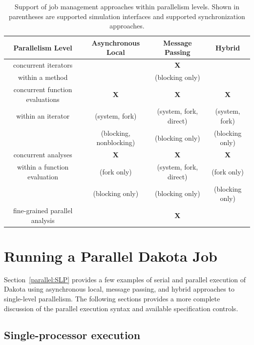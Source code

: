 \begin{table}
  \centering
  \caption{Support of job management approaches within parallelism levels.
  Shown in parentheses are supported simulation interfaces and supported
  synchronization approaches.}
  \label{parallel:table01}\vspace{2mm}
  \begin{tabular}{c||c|c|c|}
    \textbf{Parallelism Level} & \textbf{Asynchronous Local} &
    \textbf{Message Passing} & \textbf{Hybrid} \\
    \hline \hline
    concurrent iterators & & \textbf{X}      & \\
    within a method    & & (blocking only) & \\
    \hline
    concurrent function evaluations & \textbf{X} & \textbf{X} & \textbf{X} \\
    within an iterator          & (system, fork) & (system, fork, direct) &
    (system, fork) \\
    & (blocking, nonblocking) & (blocking only) & (blocking only) \\
    \hline
    concurrent analyses & \textbf{X} & \textbf{X} & \textbf{X} \\
    within a function evaluation & (fork only) & (system, fork, direct) &
    (fork only) \\
    & (blocking only) & (blocking only) & (blocking only) \\
    \hline
    fine-grained parallel analysis & & \textbf{X} & \\
    \hline
  \end{tabular}
\end{table}


\section{Running a Parallel Dakota Job}\label{parallel:running}


Section~\ref{parallel:SLP} provides a few examples of serial and
parallel execution of Dakota using asynchronous local, message
passing, and hybrid approaches to single-level parallelism.  The
following sections provides a more complete discussion of the parallel
execution syntax and available specification controls.


\subsection{Single-processor execution}\label{parallel:running:single}

